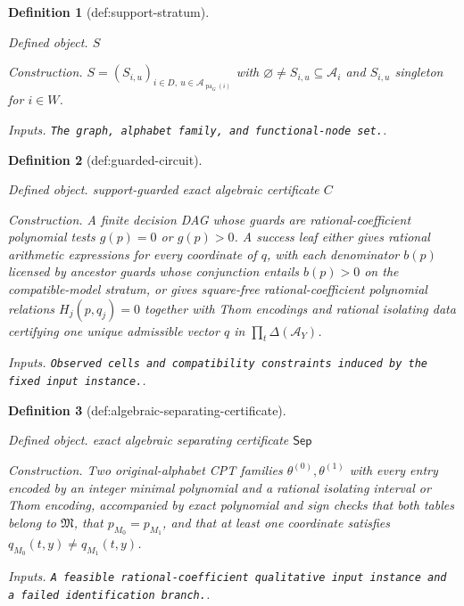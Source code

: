\documentclass{article}
\newtheorem{definition}{Definition}
\begin{document}
\begin{definition}[def:support-stratum]\label{def:support-stratum}
\par\smallskip\noindent\emph{Defined object.} \(S\)
\par\smallskip\noindent\emph{Construction.} \(S=(S_{i,u})_{i\in D,\ u\in\mathcal A_{\operatorname{pa}_G(i)}}\) with \(\varnothing\ne S_{i,u}\subseteq\mathcal A_i\) and \(S_{i,u}\) singleton for \(i\in W\).
\par\smallskip\noindent\emph{Inputs.} \texttt{The graph,\allowbreak{} alphabet family,\allowbreak{} and functional-\allowbreak{}node set.}.
\end{definition}

\begin{definition}[def:guarded-circuit]\label{def:guarded-circuit}
\par\smallskip\noindent\emph{Defined object.} support-guarded exact algebraic certificate \(C\)
\par\smallskip\noindent\emph{Construction.} A finite decision DAG whose guards are rational-coefficient polynomial tests \(g(p)=0\) or \(g(p)>0\). A success leaf either gives rational arithmetic expressions for every coordinate of \(q\), with each denominator \(b(p)\) licensed by ancestor guards whose conjunction entails \(b(p)>0\) on the compatible-model stratum, or gives square-free rational-coefficient polynomial relations \(H_j(p,q_j)=0\) together with Thom encodings and rational isolating data certifying one unique admissible vector \(q\) in \(\prod_t\Delta(\mathcal A_Y)\).
\par\smallskip\noindent\emph{Inputs.} \texttt{Observed cells and compatibility constraints induced by the fixed input instance.}.
\end{definition}

\begin{definition}[def:algebraic-separating-certificate]\label{def:algebraic-separating-certificate}
\par\smallskip\noindent\emph{Defined object.} exact algebraic separating certificate \(\mathsf{Sep}\)
\par\smallskip\noindent\emph{Construction.} Two original-alphabet CPT families \(\theta^{(0)},\theta^{(1)}\) with every entry encoded by an integer minimal polynomial and a rational isolating interval or Thom encoding, accompanied by exact polynomial and sign checks that both tables belong to \(\mathfrak M\), that \(p_{M_0}=p_{M_1}\), and that at least one coordinate satisfies \(q_{M_0}(t,y)\ne q_{M_1}(t,y)\).
\par\smallskip\noindent\emph{Inputs.} \texttt{A feasible rational-\allowbreak{}coefficient qualitative input instance and a failed identification branch.}.
\end{definition}
\end{document}
